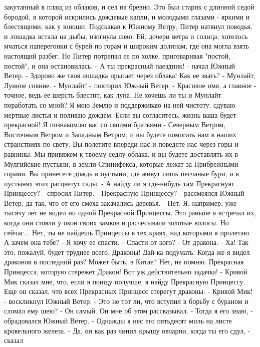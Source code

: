 закутанный в плащ из облаков, и сел на бревно. Это был старик с 
длинной седой бородой, в которой искрились дождевые капли, и молодыми 
глазами - яркими и блестящими, как у юноши.
    Подскакав к Южному Ветру, Питер натянул поводья, и лошадка встала 
на дыбы, изогнула шею.
    Ей, дочери ветра и солнца, хотелось мчаться наперегонки с бурей по 
горам и широким долинам, где она могла взять настоящий разбег. Но 
Питер потрепал ее по холке, приговаривая "постой, постой", и она 
остановилась.
    - А ты прекрасный наездник! - начал Южный Ветер. - Здорово же твоя 
лошадка прыгает через облака! Как ее звать?
    - Мунлайт, Лунное сияние.
    - Мунлайт! - повторил Южный Ветер. - Красивое имя, а главное - 
точное, ведь ее шерсть блестит, как луна. Не хочешь ли ты и Мунлайт 
поработать со мной? Я мою Землю и поддерживаю на ней чистоту: сдуваю 
мертвые листья и поливаю дождем. Если вы согласитесь, жизнь ваша будет 
прекрасной! Я познакомлю вас со своими братьями - Северным Ветром, 
Восточным Ветром и Западным Ветром, и вы будете помогать нам в наших 
странствиях по свету. Вы полетите впереди нас и поведете нас через 
горы и равнины. Мы привяжем к твоему седлу облака, и вы будете 
доставлять их в Мулгийские пустыни, в земли Спинифекса, которые лежат 
за Прибрежными горами. Вы принесете дождь в пустыни, где живут лишь 
песчаные бури, и в пустынях этих расцветут сады.
    - А найду ли я где-нибудь там Прекрасную Принцессу? - спросил 
Питер.
    - Прекрасную Принцессу? - рассмеялся Южный Ветер, да так, что от 
его смеха закачались деревья. - Нет. Я, например, уже тысячу лет не 
видел ни одной Прекрасной Принцессы. Это раньше я встречал их, когда 
они стояли у окон своих замков и расчесывали золотые волосы. Но 
сейчас... Нет, ты не найдешь Принцессы в тех краях, над которыми я 
пролетаю. А зачем она тебе?
    - Я хочу ее спасти.
    - Спасти от кого?
    - От дракона.
    - Ха! Так это, пожалуй, будет труднее всего. Драконы! Дай-ка 
подумать. Когда же я видел драконов в последний раз? Может быть, в 
Китае? Нет, не помню. Прекрасная Принцесса, которую стережет Дракон! 
Вот уж действительно задачка!
    - Кривой Мик сказал мне, что, если я поищу получше, я найду 
Прекрасную Принцессу. Еще он сказал, что всех Прекрасных Принцесс 
стерегут драконы.
    - Кривой Мик! - воскликнул Южный Ветер. - Это не тот ли, что 
вступил в борьбу с бураном и сломал ему шею?
    - Он самый. Он мне об этом рассказывал.
    - Тогда я его знаю, - обрадовался Южный Ветер. - Однажды я нес его 
пятьдесят миль на листе кровельного железа.
    - Да, он как раз чинил крышу овчарни, когда ты его сдул, - сказал 
